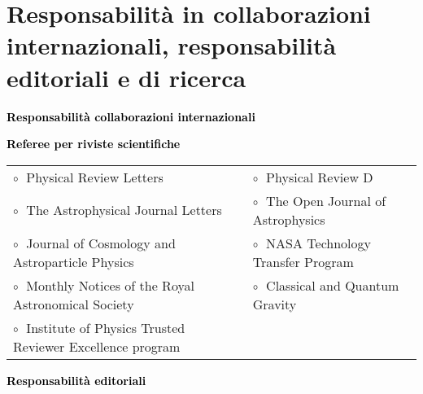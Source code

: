 \vspace{0.2cm}
\newpage
\section{Responsabilità in collaborazioni internazionali, responsabilità editoriali e di ricerca}

\textbf{\textcolor{black}{Responsabilità collaborazioni internazionali}}
\vspace{0.1cm}



\textbf{\textcolor{black}{Referee per riviste scientifiche}}
\vspace{0.1cm}

\begin{tabular}{@{\hskip 0.4cm}l@{\hskip 0.4in}l}
$\circ\;$ Physical Review Letters & $\circ\;$ Physical Review D \\
$\circ\;$ The Astrophysical Journal Letters  &  $\circ\;$  The Open Journal of Astrophysics  \\
$\circ\;$ Journal of Cosmology and Astroparticle Physics & $\circ\;$ NASA Technology Transfer Program \\
$\circ\;$ Monthly Notices of the Royal Astronomical Society& $\circ\;$ Classical and Quantum Gravity\\
$\circ\;$ Institute of Physics Trusted Reviewer Excellence program \\
\end{tabular}

\vspace{0.2cm}
\textbf{\textcolor{black}{Responsabilità editoriali}}
\vspace{0.1cm}


\vspace{-0.1cm}

